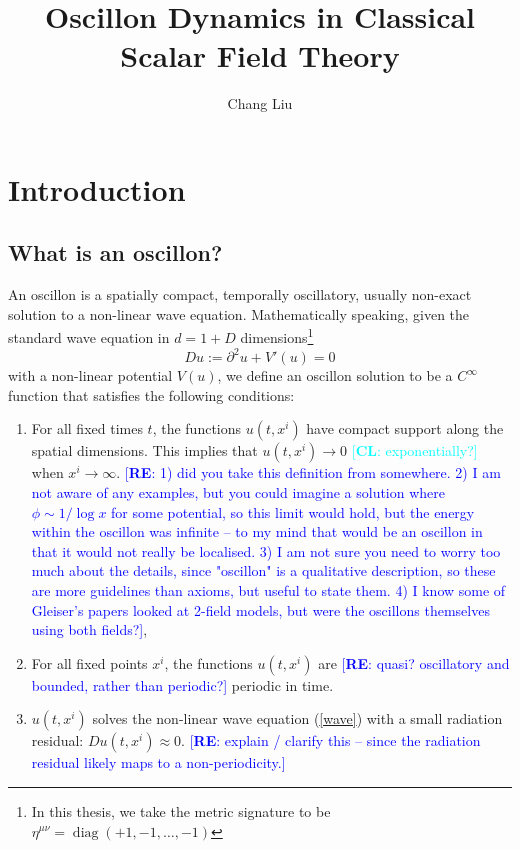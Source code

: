 \documentclass{report}
\newcommand{\re}[1]{\textcolor{blue}{[{\bf RE}: #1]}}
\newcommand{\cl}[1]{\textcolor{cyan}{[{\bf CL}: #1]}}
\DeclareMathOperator{\diag}{diag}
\begin{document}
\title{Oscillon Dynamics in Classical\\ Scalar Field Theory}
\author{Chang Liu}
\maketitle

\tableofcontents

\chapter{Introduction}
\section{What is an oscillon?}
An oscillon is a spatially compact, temporally oscillatory, usually non-exact solution to a non-linear wave equation. Mathematically speaking, given the standard wave equation in $d=1+D$ dimensions\footnote{In this thesis, we take the metric signature to be $\eta^{\mu\nu} = \diag(+1,-1,\ldots,-1)$}
\begin{equation}\label{wave}
  Du := \partial^2 u + V'(u) = 0
\end{equation}
with a non-linear potential $V(u)$, we define an oscillon solution to be a $C^\infty$ function that satisfies the following conditions:
\begin{enumerate}
\item For all fixed times $t$, the functions $u(t, x^i)$ have compact support along the spatial dimensions. This implies that $u(t,x^i)\to0$ \cl{exponentially?} when $x^i \to \infty$. \re{1) did you take this definition from somewhere. 2) I am not aware of any examples, but you could imagine a solution where $\phi \sim 1/\log{x}$ for some potential, so this limit would hold, but the energy within the oscillon was infinite -- to my mind that would be an oscillon in that it would not really be localised. 3) I am not sure you need to worry too much about the details, since "oscillon" is a qualitative description, so these are more guidelines than axioms, but useful to state them. 4) I know some of Gleiser's papers looked at 2-field models, but were the oscillons themselves using both fields?}, 
\item For all fixed points $x^i$, the functions $u(t, x^i)$ are \re{quasi? oscillatory and bounded, rather than periodic?} periodic in time.
\item $u(t,x^i)$ solves the non-linear wave equation (\ref{wave}) with a small radiation residual: $Du(t,x^i) \approx 0$. \re{explain / clarify this -- since the radiation residual likely maps to a non-periodicity.}
\end{enumerate}
\end{document}
